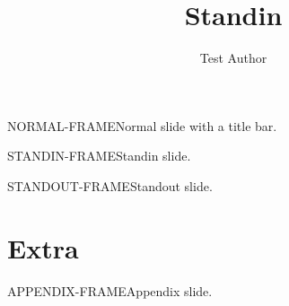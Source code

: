 \documentclass[aspectratio=169,10pt]{beamer}
\title{Standin}
\author{Test Author}
\begin{document}
\begin{frame}{NORMAL-FRAME}Normal slide with a title bar.\end{frame}
\begin{frame}[standin]{STANDIN-FRAME}Standin slide.\end{frame}
\begin{frame}[standout]{STANDOUT-FRAME}Standout slide.\end{frame}
\appendix
\section{Extra}
\begin{frame}{APPENDIX-FRAME}Appendix slide.\end{frame}
\end{document}
